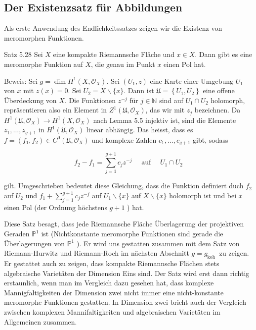 \documentclass[10pt, letterpaper]{article}
\begin{document}
\subsection {Der Existenzsatz für Abbildungen}
Als erste Anwendung des Endlichkeitssatzes zeigen wir die Existenz von meromorphen Funktionen.

Satz 5.28 Sei $X$ eine kompakte Riemannsche Fläche und $x \in X$. Dann gibt es eine meromorphe Funktion auf $X$, die genau im Punkt $x$ einen Pol hat.

Beweis: Sei $g=\operatorname{dim} H^{1}\left(X, \mathcal{O}_{X}\right)$. Sei $\left(U_{1}, z\right)$ eine Karte einer Umgebung $U_{1}$ von $x$ mit $z(x)=0$. Sei $U_{2}=X \backslash\{x\}$. Dann ist $\mathfrak{U}=\left\{U_{1}, U_{2}\right\}$ eine offene Überdeckung von $X$. Die Funktionen $z^{-j}$ für $j \in \mathbb{N}$ sind auf $U_{1} \cap U_{2}$ holomorph, repräsentieren also ein Element in $Z^{1}\left(\mathfrak{U}, \mathcal{O}_{X}\right)$, das wir mit $z_{j}$ bezeichnen. Da $H^{1}\left(\mathfrak{U}, \mathcal{O}_{X}\right) \rightarrow H^{1}\left(X, \mathcal{O}_{X}\right)$ nach Lemma 5.5 injektiv ist, sind die Elemente $z_{1}, \ldots, z_{g+1}$ in $H^{1}\left(\mathfrak{U}, \mathcal{O}_{X}\right)$ linear abhängig. Das heisst, dass es $f=\left(f_{1}, f_{2}\right) \in C^{0}\left(\mathfrak{U}, \mathcal{O}_{X}\right)$ und komplexe Zahlen $c_{1}, \ldots, c_{g+1}$ gibt, sodass

$$
f_{2}-f_{1}=\sum_{j=1}^{g+1} c_{j} z^{-j} \quad \text { auf } \quad U_{1} \cap U_{2}
$$

gilt. Umgeschrieben bedeutet diese Gleichung, dass die Funktion definiert duch $f_{2}$ auf $U_{2}$ und $f_{1}+\sum_{j=1}^{g+1} c_{j} z^{-j}$ auf $U_{1} \backslash\{x\}$ auf $X \backslash\{x\}$ holomorph ist und bei $x$ einen Pol (der Ordnung höchstens $g+1$ ) hat.

Diese Satz besagt, dass jede Riemannsche Fläche Überlagerung der projektiven Geraden $\mathbb{P}^{1}$ ist (Nichtkonstante meromorphe Funktionen sind gerade die Überlagerungen von $\mathbb{P}^{1}$ ). Er wird uns gestatten zusammen mit dem Satz von Riemann-Hurwitz und Riemann-Roch im nächsten Abschnitt $g=g_{\text {koh }}$ zu zeigen. Er gestattet auch zu zeigen, dass kompakte Riemannsche Flächen stets algebraische Varietäten der Dimension Eins sind. Der Satz wird erst dann richtig erstaunlich, wenn man im Vergleich dazu gesehen hat, dass komplexe Mannigfaltigkeiten der Dimension zwei nicht immer eine nicht-konstante meromorphe Funktionen gestatten. In Dimension zwei bricht auch der Vergleich zwischen komplexen Mannifaltigkeiten und algebraischen Varietäten im Allgemeinen zusammen.
\end{document}
